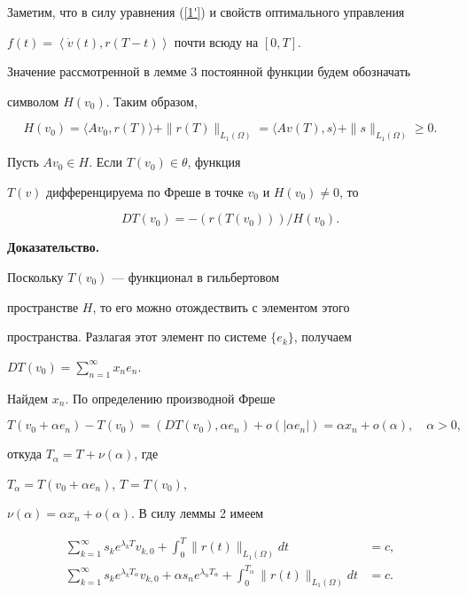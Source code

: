Заметим, что в силу уравнения (\ref{1'}) и свойств оптимального управления


$f(t)=\left\langle\Dot v(t),r(T-t)\right\rangle$ почти всюду на $[0,T]$.





Значение рассмотренной в лемме 3 постоянной функции будем обозначать


символом $H(v_0)$. Таким образом, 


$$


H(v_0)=\langle Av_0,r(T)\rangle+\|r(T) \|_{L_1(\Omega)} =


\langle Av(T),s\rangle+\|s \|_{L_1(\Omega)} \ge0.


$$





\begin{lem}


Пусть $Av_0\in H$. Если $T(v_0)\in\theta$, функция


$T(v)$ дифференцируема по Фреше в точке $v_0$ и $H(v_0)\neq0$, то 


$$


DT(v_0)=-(r(T(v_0)))/H(v_0).


$$


\end{lem}





{\bf Доказательство.}


Поскольку $T(v_0)$ --- функционал в гильбертовом


пространстве $H$, то его можно отождествить с элементом этого


пространства. Разлагая этот элемент по системе $\{e_k\}$, получаем


$DT(v_0)= \sum\limits_{n=1}^\infty  x_ne_n$.


Найдем $x_n$. По определению производной Фреше


$$


T(v_0+\alpha e_n)-T(v_0)=(DT(v_0),\alpha e_n)+o(|\alpha e_n|)=


\alpha x_n+o(\alpha),\quad\alpha>0,


$$


откуда $T_\alpha=T+\nu(\alpha)$, где


$T_\alpha=T(v_0+\alpha e_n)$, $T=T(v_0)$,


$\nu(\alpha)=\alpha x_n+o(\alpha)$. В силу леммы 2 имеем


\begin{align}


\label{ee1}


\sum_{k=1}^\infty s_k e^{\lambda_k T}v_{k,0}+\int_0^T\|r(t)\|_{L_1(\Omega)}


dt&=c, \\


%


\label{ee2}


\sum_{k=1}^\infty s_k e^{\lambda_k {T_\alpha}}


v_{k,0}+\alpha s_n e^{\lambda_nT_\alpha}+


\int_0^{T_\alpha}\|r(t) \|_{L_1(\Omega)}  dt&=c.


\end{align}


